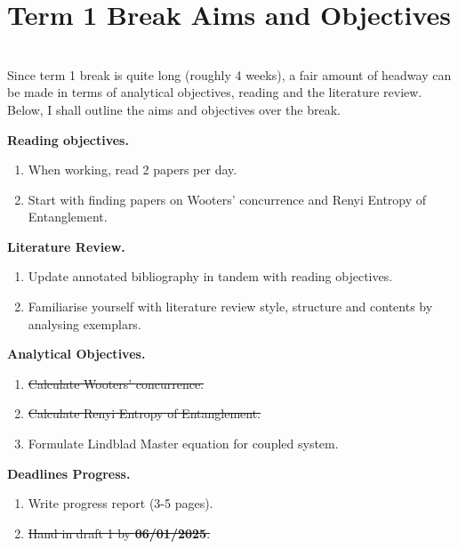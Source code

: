 \documentclass{article}
\begin{document}
\section*{Term 1 Break Aims and Objectives}
\\

Since term 1 break is quite long (roughly 4 weeks), a fair amount of headway can be made in terms of analytical objectives, reading and the literature review. Below, I shall outline the aims and objectives over the break.

\vspace{0.5cm}

\textbf{Reading objectives.}
\begin{enumerate}
    \item When working, read 2 papers per day.
    \item Start with finding papers on Wooters' concurrence and Renyi Entropy of Entanglement.
\end{enumerate}


\vspace{0.5cm}


\textbf{Literature Review.} 
\begin{enumerate}
    \item Update annotated bibliography in tandem with reading objectives.
    \item Familiarise yourself with literature review style, structure and contents by analysing exemplars.
\end{enumerate}


\vspace{0.5cm}


\textbf{Analytical Objectives.}
\begin{enumerate}
    \item \sout{Calculate Wooters' concurrence.}
    \item \sout{Calculate Renyi Entropy of Entanglement.}
    \item Formulate Lindblad Master equation for coupled system. 
\end{enumerate}


\vspace{0.5cm}


\textbf{Deadlines Progress.}
\begin{enumerate}
    \item Write progress report (3-5 pages).
    \item \sout{Hand in draft 1 by \textbf{06/01/2025}.}
\end{enumerate}
\end{document}
